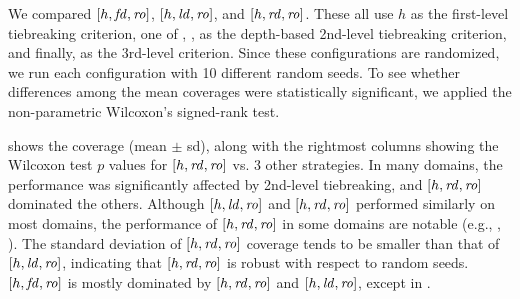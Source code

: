 We compared 
$[h,{\mbox{\textit{fd}}},{\mbox{\textit{ro}}}]$, $[h,{\mbox{\textit{ld}}},{\mbox{\textit{ro}}}]$, and $[h,{\mbox{\textit{rd}}},{\mbox{\textit{ro}}}]$. These all use 
$h$ as the first-level tiebreaking criterion, one of \fd, \ld, \rd as
the depth-based 2nd-level tiebreaking criterion, and finally,
\ro as the 3rd-level criterion.
Since these configurations are randomized, we run each configuration with 10 different random seeds.
To see whether differences among the mean coverages were statistically significant,
we applied the non-parametric Wilcoxon's signed-rank test.

 shows the coverage (mean $\pm$ sd),
along with the rightmost columns showing the 
Wilcoxon test $p$ values  for  $[h,{\mbox{\textit{rd}}},{\mbox{\textit{ro}}}]$ vs. 3 other strategies.
In many domains,
the performance was significantly affected by 2nd-level tiebreaking, and
$[h,{\mbox{\textit{rd}}},{\mbox{\textit{ro}}}]$ dominated the others. 
Although $[h, {\mbox{\textit{ld}}}, {\mbox{\textit{ro}}}]$ and $[h,{\mbox{\textit{rd}}},{\mbox{\textit{ro}}}]$ performed similarly on most domains, 
the performance of $[h,{\mbox{\textit{rd}}},{\mbox{\textit{ro}}}]$ in some
domains are notable (e.g., , ). 
The standard deviation of $[h,{\mbox{\textit{rd}}},{\mbox{\textit{ro}}}]$ coverage tends to be smaller
than that of $[h,{\mbox{\textit{ld}}},{\mbox{\textit{ro}}}]$, indicating that $[h,{\mbox{\textit{rd}}},{\mbox{\textit{ro}}}]$ is robust with respect to random seeds.
$[h,{\mbox{\textit{fd}}},{\mbox{\textit{ro}}}]$ is mostly dominated by $[h,{\mbox{\textit{rd}}},{\mbox{\textit{ro}}}]$ and $[h,{\mbox{\textit{ld}}},{\mbox{\textit{ro}}}]$,
except in .


